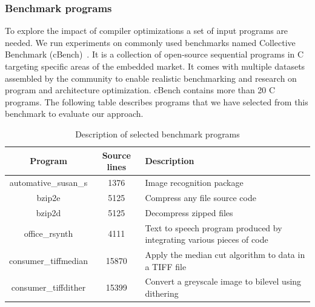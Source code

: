 \subsubsection{Benchmark programs}
To explore the impact of compiler optimizations a set of input programs are needed. We run experiments on commonly used benchmarks named Collective Benchmark (cBench)~\cite{fursin2009collective}. It is a collection of open-source sequential programs in C targeting specific areas of the embedded market. It comes with multiple datasets assembled by the community to enable realistic benchmarking and research on program and architecture optimization. cBench contains more than 20 C programs. The following table describes programs that we have selected from this benchmark to evaluate our approach.
\begin{table}[h]
	\begin{center}
		\begin{tabular}{|c|c|p{3.9cm}|}
			\hline
			\textbf{Program} & \textbf{Source lines} & \textbf{Description}\\
			\hline
			automative\_susan\_s & 1376 & Image recognition package\\
			\hline
			bzip2e & 5125 & Compress any file
			source code \\
			\hline
			bzip2d & 5125 & Decompress zipped files \\
			\hline
			office\_rsynth & 4111 & Text to speech program produced by integrating various pieces of code\\
			\hline
			consumer\_tiffmedian& 15870 & Apply the median cut algorithm to data in a TIFF file
			\\
			
			\hline
			 consumer\_tiffdither& 15399 & Convert a greyscale image to bilevel using dithering
			 \\
			\hline
			
		\end{tabular}
		
	\end{center}
	\caption {Description of selected benchmark programs}
\end{table}

